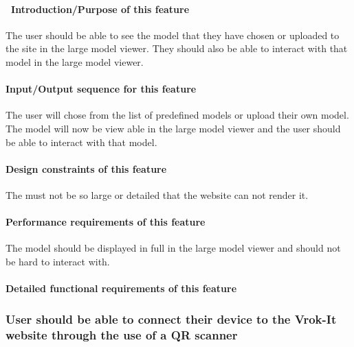 \documentclass[letterpaper, 10pt, draftclsnofoot, onecolumn]{IEEEtran}
\begin{document}
{\paragraph[\ Introduction/Purpose of this
feature]{\foreignlanguage{english}{\ }\foreignlanguage{english}{Introduction/Purpose
of this feature}}
{\color{black}
The user should be able to see the model that they have chosen or uploaded to the site in the large model viewer. They should also be able to
interact with that model in the large model viewer.  }

\paragraph[Input/Output sequence for this
feature]{\rmfamily\bfseries\color{black}
Input/Output sequence for this feature}
{\color{black}
The user will chose from the list of predefined models or upload their own model. The model will now be view able in the large model viewer and
the user should be able to interact with that model. }

\paragraph[Design constraints of this
feature]{\rmfamily\bfseries\color{black} Design
constraints of this feature}
{\color{black}
The must not be so large or detailed that the website can not render it. }

\paragraph[Performance requirements of this
feature]{\rmfamily\bfseries\color{black}
Performance requirements of this feature}
{\color{black}
The model should be displayed in full in the large model viewer and should not be hard to interact with. }

\paragraph[Detailed functional requirements of this
feature]{\rmfamily\bfseries\color{black}
Detailed functional requirements of this feature}


\subsubsection[{Connect to smartphone}]{\rmfamily\bfseries\color{black} User should be able to connect their device to
the Vrok-It website through the use of a QR scanner}
}
\end{document}
